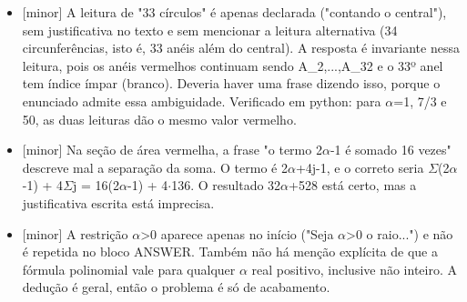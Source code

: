 \documentclass{article}%
\begin{document}
\begin{itemize}%
\item%
{[}minor{]} A leitura de "33 círculos" é apenas declarada ("contando o central"), sem justificativa no texto e sem mencionar a leitura alternativa (34 circunferências, isto é, 33 anéis além do central). A resposta é invariante nessa leitura, pois os anéis vermelhos continuam sendo A\_2,...,A\_32 e o 33º anel tem índice ímpar (branco). Deveria haver uma frase dizendo isso, porque o enunciado admite essa ambiguidade. Verificado em python: para $\alpha$=1, 7/3 e 50, as duas leituras dão o mesmo valor vermelho.%
\item%
{[}minor{]} Na seção de área vermelha, a frase "o termo 2$\alpha$-1 é somado 16 vezes" descreve mal a separação da soma. O termo é 2$\alpha$+4j-1, e o correto seria $\Sigma$(2$\alpha$-1) + 4$\Sigma$j = 16(2$\alpha$-1) + 4$\cdot$136. O resultado 32$\alpha$+528 está certo, mas a justificativa escrita está imprecisa.%
\item%
{[}minor{]} A restrição $\alpha$>0 aparece apenas no início ("Seja $\alpha$>0 o raio...") e não é repetida no bloco ANSWER. Também não há menção explícita de que a fórmula polinomial vale para qualquer $\alpha$ real positivo, inclusive não inteiro. A dedução é geral, então o problema é só de acabamento.%
\end{itemize}%
\end{document}
